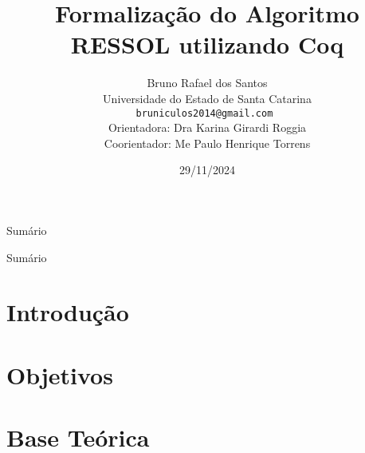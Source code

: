 \documentclass[xcolor=table]{beamer}
\title[]{Formalização do Algoritmo RESSOL utilizando Coq}
\author[Bruno Rafael dos Santos]{
    Bruno Rafael dos Santos\\\smallskip
    {\scriptsize Universidade do Estado de Santa Catarina \\\smallskip
    \texttt{bruniculos2014@gmail.com
    }\\\medskip
    {Orientadora: Dra Karina Girardi Roggia}\\
    {Coorientador: Me Paulo Henrique Torrens}\\
    }
}
\date{29/11/2024}
\begin{document}
    \begin{frame}
        \titlepage
    \end{frame}

    \begin{frame}{Sumário}
        \tableofcontents[sections=0-3]
    \end{frame}
    
    \begin{frame}{Sumário}
        \tableofcontents[sections=4-10]
    \end{frame}

    \section[]{Introdução}
    
        
    
    \section[]{Objetivos}

        



    \section[]{Base Teórica} 
\end{document}
